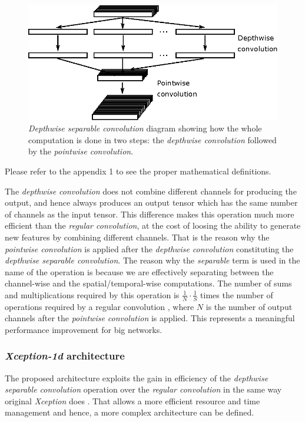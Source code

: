 \documentclass{elsarticle}
\begin{document}
\begin{figure}[ht]
	\centering
	\includegraphics[width=0.65\linewidth]{img/dws_conv}
	\caption{\textit{Depthwise separable convolution} diagram showing how the whole computation is done in two steps: the \textit{depthwise convolution} followed by the \textit{pointwise convolution}.}
	\label{fig:dwsconv}
\end{figure}

Please refer to the appendix 1 to see the proper mathematical definitions.

The \textit{depthwise convolution} does not combine different channels for producing the output, and hence always produces an output tensor which has the same number of channels as the input tensor. This difference makes this operation much more efficient than the \textit{regular convolution}, at the cost of loosing the ability to generate new features by combining different channels. That is the reason why the \textit{pointwise convolution} is applied after the \textit{depthwise convolution} constituting the \textit{depthwise separable convolution}. The reason why the \textit{separable} term is used in the name of the operation is because we are effectively separating between the channel-wise and the spatial/temporal-wise computations. The number of sums and multiplications required by this operation is $\frac{1}{N} \cdot \frac{1}{S}$ times the number of operations required by a regular convolution \cite{Howard2017}, where $N$ is the number of output channels after the \textit{pointwise convolution} is applied. This represents a meaningful performance improvement for big networks.



\subsubsection{\textit{Xception-1d} architecture}
The proposed architecture exploits the gain in efficiency of the \textit{depthwise separable convolution} operation over the \textit{regular convolution} in the same way original \textit{Xception} does \cite{FChollet2017}. That allows a more efficient resource and time management and hence, a more complex architecture can be defined. 
\end{document}
